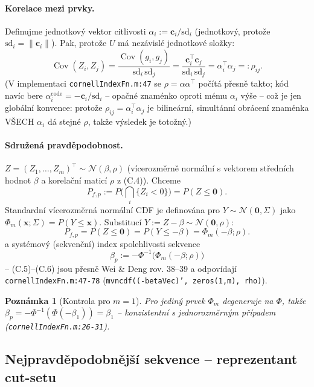 \documentclass[11pt,a4paper]{article}
\newtheorem{remark}{Poznámka}
\newcommand{\code}[1]{\texttt{#1}}
\newcommand{\Cov}{\operatorname{Cov}}
\begin{document}
\paragraph{Korelace mezi prvky.} Definujme jednotkový vektor citlivosti $\alpha_i := \mathbf c_i/\mathrm{sd}_i$
(jednotkový, protože $\mathrm{sd}_i=\|\mathbf c_i\|$). Pak, protože $U$ má nezávislé jednotkové složky:
\[
  \Cov(Z_i,Z_j) = \frac{\Cov(g_i,g_j)}{\mathrm{sd}_i\,\mathrm{sd}_j}
  = \frac{\mathbf c_i^\top \mathbf c_j}{\mathrm{sd}_i\,\mathrm{sd}_j} = \alpha_i^\top \alpha_j =: \rho_{ij}.
\tag{C.4}
\]
(V implementaci \code{cornellIndexFn.m:47} se $\rho=\alpha\alpha^\top$ počítá přesně takto; kód navíc
bere $\alpha_i^{\mathrm{code}} = -\mathbf c_i/\mathrm{sd}_i$ -- opačné znaménko oproti mému $\alpha_i$ výše
-- což je jen globální konvence: protože $\rho_{ij}=\alpha_i^\top\alpha_j$ je bilineární, simultánní
obrácení znaménka VŠECH $\alpha_i$ dá stejné $\rho$, takže výsledek je totožný.)

\paragraph{Sdružená pravděpodobnost.} $Z=(Z_1,\dots,Z_m)^\top \sim \mathcal N(\beta,\rho)$
(vícerozměrně normální s vektorem středních hodnot $\beta$ a korelační maticí $\rho$ z (C.4)). Chceme
\[
  P_{f,p} := P\Big(\bigcap_i \{Z_i<0\}\Big) = P(Z\le \mathbf 0).
\]
Standardní vícerozměrná normální CDF je definována pro $Y\sim\mathcal N(\mathbf 0,\Sigma)$ jako
$\Phi_m(\mathbf x;\Sigma)=P(Y\le\mathbf x)$. Substitucí $Y:=Z-\beta\sim\mathcal N(\mathbf 0,\rho)$:
\[
  P_{f,p} = P(Z\le\mathbf 0) = P(Y\le -\beta) = \Phi_m(-\beta;\rho).
\tag{C.5}
\]
a systémový (sekvenční) index spolehlivosti sekvence
\[
  \boxed{\;\beta_p := -\Phi^{-1}\big(\Phi_m(-\beta;\rho)\big)\;}
\tag{C.6}
\]
-- (C.5)--(C.6) jsou přesně Wei \& Deng rov. 38--39 a odpovídají \code{cornellIndexFn.m:47-78}
(\code{mvncdf((-betaVec)', zeros(1,m), rho)}).

\begin{remark}[Kontrola pro $m=1$]
Pro jediný prvek $\Phi_m$ degeneruje na $\Phi$, takže $\beta_p = -\Phi^{-1}(\Phi(-\beta_1)) = \beta_1$
-- konzistentní s jednorozměrným případem (\code{cornellIndexFn.m:26-31}).
\end{remark}

\subsection{Nejpravděpodobnější sekvence -- reprezentant cut-setu}
\label{sec:c3}
\end{document}

